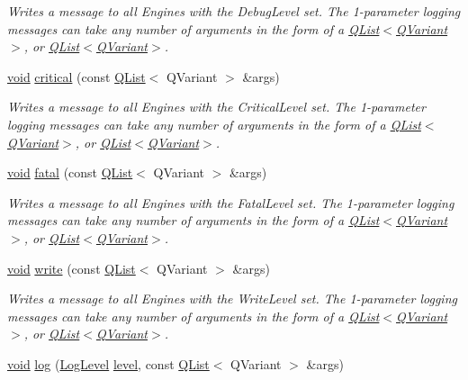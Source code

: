 \begin{DoxyCompactItemize}
\begin{DoxyCompactList}\small\item\em Writes a message to all Engines with the Debug\-Level set. The 1-\/parameter logging messages can take any number of arguments in the form of a \hyperlink{class_q_list}{Q\-List$<$\-Q\-Variant$>$}, or \hyperlink{class_q_list}{Q\-List$<$\-Q\-Variant$>$}. \end{DoxyCompactList}\item 
\hyperlink{group___u_a_v_objects_plugin_ga444cf2ff3f0ecbe028adce838d373f5c}{void} \hyperlink{class_qxt_logger_af83a0cd75a7188ef7501f17fddfae286}{critical} (const \hyperlink{class_q_list}{Q\-List}$<$ Q\-Variant $>$ \&args)
\begin{DoxyCompactList}\small\item\em Writes a message to all Engines with the Critical\-Level set. The 1-\/parameter logging messages can take any number of arguments in the form of a \hyperlink{class_q_list}{Q\-List$<$\-Q\-Variant$>$}, or \hyperlink{class_q_list}{Q\-List$<$\-Q\-Variant$>$}. \end{DoxyCompactList}\item 
\hyperlink{group___u_a_v_objects_plugin_ga444cf2ff3f0ecbe028adce838d373f5c}{void} \hyperlink{class_qxt_logger_abb1b81f9a839f5f04ae86d0e8dfb0c64}{fatal} (const \hyperlink{class_q_list}{Q\-List}$<$ Q\-Variant $>$ \&args)
\begin{DoxyCompactList}\small\item\em Writes a message to all Engines with the Fatal\-Level set. The 1-\/parameter logging messages can take any number of arguments in the form of a \hyperlink{class_q_list}{Q\-List$<$\-Q\-Variant$>$}, or \hyperlink{class_q_list}{Q\-List$<$\-Q\-Variant$>$}. \end{DoxyCompactList}\item 
\hyperlink{group___u_a_v_objects_plugin_ga444cf2ff3f0ecbe028adce838d373f5c}{void} \hyperlink{class_qxt_logger_abc171eb3c9a4f8a4b170b1204979977f}{write} (const \hyperlink{class_q_list}{Q\-List}$<$ Q\-Variant $>$ \&args)
\begin{DoxyCompactList}\small\item\em Writes a message to all Engines with the Write\-Level set. The 1-\/parameter logging messages can take any number of arguments in the form of a \hyperlink{class_q_list}{Q\-List$<$\-Q\-Variant$>$}, or \hyperlink{class_q_list}{Q\-List$<$\-Q\-Variant$>$}. \end{DoxyCompactList}\item 
\hyperlink{group___u_a_v_objects_plugin_ga444cf2ff3f0ecbe028adce838d373f5c}{void} \hyperlink{class_qxt_logger_aa21d1a9fb5ccd542168fe526e26caea4}{log} (\hyperlink{class_qxt_logger_ac2071072628aa786466124cc32a324e7}{Log\-Level} \hyperlink{glext_8h_abc60a79088789bd61297bf5f9ff500d1}{level}, const \hyperlink{class_q_list}{Q\-List}$<$ Q\-Variant $>$ \&args)
\end{DoxyCompactItemize}
